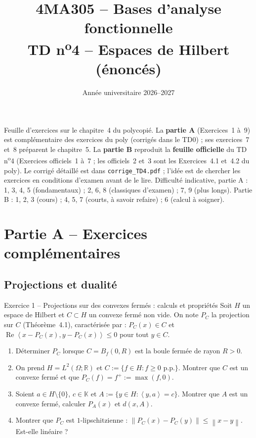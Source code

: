 \documentclass[11pt,a4paper]{article}
\title{\textbf{4MA305 -- Bases d'analyse fonctionnelle}\\[2mm]
\Large TD n\textsuperscript{o}4 -- Espaces de Hilbert (énoncés)}
\author{}
\date{Année universitaire 2026--2027}
\newcommand{\R}{\mathbb{R}}
\newcommand{\K}{\mathbb{K}}
\newcommand{\Bf}{B_f}
\newcommand{\norm}[1]{\left\|#1\right\|}
\newcommand{\ps}[2]{\left\langle #1,#2\right\rangle}
\renewcommand{\Re}{\operatorname{Re}}
\theoremstyle{definition}
\begin{document}
\maketitle

\begin{commentaire}
Feuille d'exercices sur le chapitre~4 du polycopié. La \textbf{partie A} (Exercices~1 à~9) est complémentaire des exercices du poly (corrigés dans le TD0) ; ses exercices~7 et~8 préparent le chapitre~5. La \textbf{partie B} reproduit la \textbf{feuille officielle} du TD n\textsuperscript{o}4 (Exercices officiels~1 à~7 ; les officiels~2 et~3 sont les Exercices~4.1 et~4.2 du poly). Le corrigé détaillé est dans \texttt{corrige\_TD4.pdf} ; l'idée est de chercher les exercices en conditions d'examen avant de le lire. Difficulté indicative, partie A : 1, 3, 4, 5 (fondamentaux) ; 2, 6, 8 (classiques d'examen) ; 7, 9 (plus longs). Partie B : 1, 2, 3 (cours) ; 4, 5, 7 (courts, à savoir refaire) ; 6 (calcul à soigner).
\end{commentaire}

\section*{Partie A -- Exercices complémentaires}

\subsection*{Projections et dualité}

\begin{exo}{Exercice 1 -- Projections sur des convexes fermés : calculs et propriétés}
Soit $H$ un espace de Hilbert et $C\subset H$ un convexe fermé non vide. On note $P_C$ la projection sur $C$ (Théorème~4.1), caractérisée par : $P_C(x)\in C$ et $\Re\ps{x-P_C(x)}{y-P_C(x)}\le0$ pour tout $y\in C$.
\begin{enumerate}[label=(\alph*)]
  \item Déterminer $P_C$ lorsque $C=\Bf(0,R)$ est la boule fermée de rayon $R>0$.
  \item On prend $H=L^2(\Omega;\R)$ et $C:=\{f\in H : f\ge0\text{ p.p.}\}$. Montrer que $C$ est un convexe fermé et que $P_C(f)=f^+:=\max(f,0)$.
  \item Soient $a\in H\setminus\{0\}$, $c\in\K$ et $A:=\{y\in H:\ps ya=c\}$. Montrer que $A$ est un convexe fermé, calculer $P_A(x)$ et $d(x,A)$.
  \item Montrer que $P_C$ est $1$-lipschitzienne : $\norm{P_C(x)-P_C(y)}\le\norm{x-y}$. Est-elle linéaire ?
\end{enumerate}
\end{exo}
\end{document}
